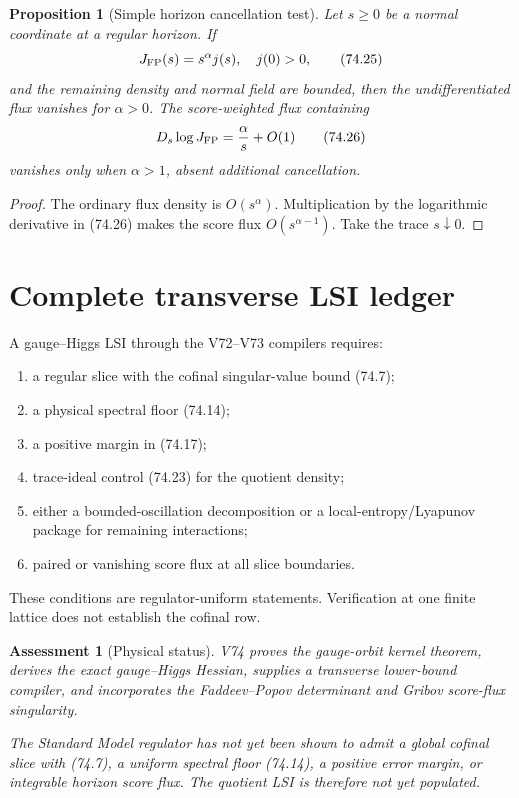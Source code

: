 \documentclass[11pt]{article}
\newtheorem{proposition}[theorem]{Proposition}
\newtheorem{assessment}[theorem]{Assessment}
\theoremstyle{remark}
\begin{document}
\begin{proposition}[Simple horizon cancellation test]
\label{prop:v15v74-horizon}
Let \(s\geq0\) be a normal coordinate at a regular horizon.  If
\[
 J_{\rm FP}(s)=s^\alpha j(s),\quad j(0)>0,             \tag{74.25}
\]
and the remaining density and normal field are bounded, then the
undifferentiated flux vanishes for \(\alpha>0\).  The score-weighted
flux containing
\[
 D_s\log J_{\rm FP}=\frac{\alpha}{s}+O(1)             \tag{74.26}
\]
vanishes only when \(\alpha>1\), absent additional cancellation.
\end{proposition}

\begin{proof}
The ordinary flux density is \(O(s^\alpha)\).  Multiplication by
the logarithmic derivative in (74.26) makes the score flux
\(O(s^{\alpha-1})\).  Take the trace \(s\downarrow0\).
\end{proof}

\section{Complete transverse LSI ledger}

A gauge--Higgs LSI through the V72--V73 compilers requires:
\begin{enumerate}
\item a regular slice with the cofinal singular-value bound (74.7);
\item a physical spectral floor (74.14);
\item a positive margin in (74.17);
\item trace-ideal control (74.23) for the quotient density;
\item either a bounded-oscillation decomposition or a
      local-entropy/Lyapunov package for remaining interactions;
\item paired or vanishing score flux at all slice boundaries.
\end{enumerate}
These conditions are regulator-uniform statements.  Verification
at one finite lattice does not establish the cofinal row.

\begin{assessment}[Physical status]
\label{ass:v15v74-status}
V74 proves the gauge-orbit kernel theorem, derives the exact
gauge--Higgs Hessian, supplies a transverse lower-bound compiler,
and incorporates the Faddeev--Popov determinant and Gribov
score-flux singularity.

The Standard Model regulator has not yet been shown to admit a
global cofinal slice with (74.7), a uniform spectral floor
(74.14), a positive error margin, or integrable horizon score
flux.  The quotient LSI is therefore not yet populated.
\end{assessment}
\end{document}
